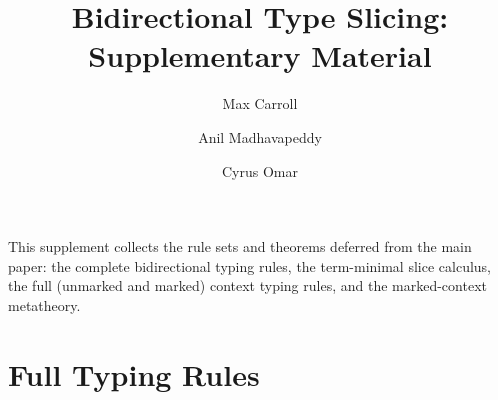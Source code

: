 \documentclass[acmsmall,screen,review,nonacm]{acmart}
\begin{document}
\title{Bidirectional Type Slicing: Supplementary Material}
\author{Max Carroll}
\author{Anil Madhavapeddy}
\author{Cyrus Omar}
\maketitle

\noindent This supplement collects the rule sets and theorems deferred from the
main paper: the complete bidirectional typing rules, the term-minimal slice
calculus, the full (unmarked and marked) context typing rules, and the
marked-context metatheory.

\section{Full Typing Rules}
\label{supp:typing-rules}
\end{document}
